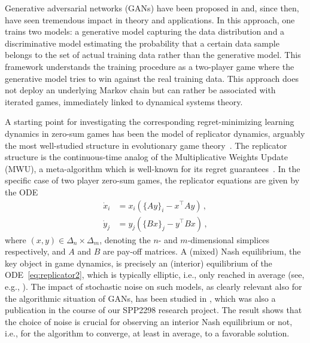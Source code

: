 \documentclass[10pt]{article}
\begin{document}
Generative adversarial networks (GANs) have been proposed in \cite{Goodfellowetal} and, since then, have seen tremendous impact in theory and applications. In this approach, one trains two models: a generative model capturing the data distribution and a discriminative model estimating
the probability that a certain data sample belongs to the set of actual training data rather than the generative model. This framework understands the training procedure as a two-player game where the generative model tries to win against the real training data. This approach does not deploy an underlying Markov chain but can rather be associated with iterated games, immediately linked to dynamical systems theory. 

A starting point for investigating the corresponding regret-minimizing learning dynamics in zero-sum games has been the model of replicator dynamics, arguably the most well-studied structure in evolutionary game theory~\cite{Weibull}. The replicator structure is the continuous-time analog of the Multiplicative Weights Update (MWU), a meta-algorithm which is well-known for its regret guarantees~\cite{Aroraetal}. 
In the specific case of two player zero-sum games, the replicator equations are given by the ODE
\begin{equation}  \label{eq:replicator2}
\begin{array}{rl}
	\dot x_i &= x_i \left(\{Ay\}_i - x^{\top} Ay\right)\,,\\
	\dot y_j &= y_j \left(\{Bx\}_j - y^{\top} Bx\right)\,,
\end{array}
\end{equation}
where $(x, y) \in \Delta_n \times \Delta_m$, denoting the $n$- and $m$-dimensional simplices respectively, and $A$ and $B$ are pay-off matrices. A (mixed) Nash equilibrium, the key object in game dynamics, is precisely an (interior) equilibrium of the ODE~\eqref{eq:replicator2}, which is typically elliptic, i.e., only reached in average (see, e.g., \cite{Hofbauer}). 
The impact of stochastic noise on such models, as clearly relevant also for the algorithmic situation of GANs, has been studied in \cite{EngelPiliouras}, which was also a publication in the course of our SPP2298 research project. The result shows that the choice of noise is crucial for observing an interior Nash equilibrium or not, i.e., for the algorithm to converge, at least in average, to a favorable solution.
\end{document}
